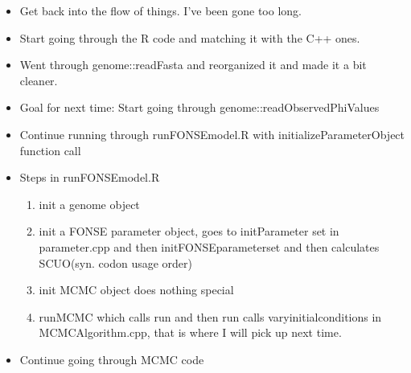 \documentclass[letterpaper,index=totoc,hyperref,openany]{labbook} %
\begin{document}

\begin{itemize}
	\item Get back into the flow of things. I've been gone too long.
	\item Start going through the R code and matching it with the C++ ones.
\end{itemize}

\begin{itemize}
	\item Went through genome::readFasta and reorganized it and made it a bit cleaner.
	\item Goal for next time: Start going through genome::readObservedPhiValues
\end{itemize}


\begin{itemize}
	\item Continue running through runFONSEmodel.R with initializeParameterObject function call
\end{itemize}

\begin{itemize}
	\item Steps in runFONSEmodel.R
	\begin{enumerate}
		\item init a genome object
		\item init a FONSE parameter object, goes to initParameter set in parameter.cpp and then initFONSEparameterset and then calculates SCUO(syn. codon usage order)
		\item init MCMC object does nothing special
		\item runMCMC which calls run and then run calls varyinitialconditions in MCMCAlgorithm.cpp, that is where I will pick up next time.
	\end{enumerate}
\end{itemize}


\begin{itemize}
	\item Continue going through MCMC code
\end{itemize}
\end{document}

